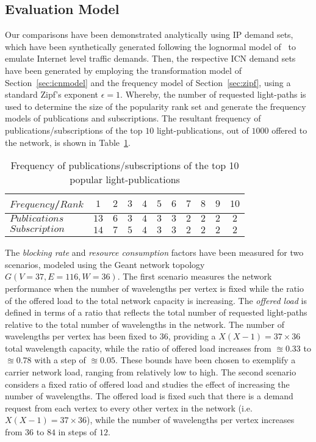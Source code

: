 \documentclass[journal]{IEEEtran}
\begin{document}
\subsection{Evaluation Model}
Our comparisons have been demonstrated analytically using IP demand sets, which have been synthetically generated following the lognormal model of~\cite{nuc:tm} to emulate Internet level traffic demands. Then, the respective ICN demand sets have been generated by employing the transformation model of Section~\ref{sec:icnmodel} and the frequency model of Section~\ref{sec:zipf}, using a standard Zipf's exponent $\epsilon=1$. Whereby, the number of requested light-paths is used to determine the size of the popularity rank set and generate the frequency models of publications and subscriptions. 
The resultant frequency of publications/subscriptions of the top $10$ light-publications, out of $1000$ offered to the network, is shown in Table~\ref{tab:frq}.
\begin{table}[tb]
  \centering
  \caption{Frequency of publications/subscriptions of the top 10 popular light-publications}
  \label{tab:frq}
  \begin{tabular}{l | c c c c c c c c c c}
  	\hline
    $Frequency$/$Rank$ & $1$ & $2$ & $3$ & $4$ & $5$ & $6$ & $7$ & $8$ & $9$ & $10$\\
     \hline 
    	$Publications$ & $13$ & $6$ & $3$ & $4$ & $3$ & $3$ & $2$ & $2$ & $2$ & $2$\\ 
    $Subscription$ & $14$ & $7$ & $5$ & $4$ & $3$ & $3$ & $2$ & $2$ & $2$ & $2$\\ 
    \hline 
  \end{tabular}
\end{table}

The \emph{blocking rate} and \emph{resource consumption} factors have been measured for two scenarios, modeled using the Geant network topology~\cite{kni:zoo} $G(V=37,E=116,W=36)$. 
The first scenario measures the network performance when the number of
wavelengths per vertex is fixed while the ratio of the offered load to
the total network capacity is increasing. The \emph{offered load} is
defined in terms of a ratio that reflects the total number of
requested light-paths relative to the total number of wavelengths in
the network. The number of wavelengths per vertex has been fixed to
$36$, providing a $X(X-1) = 37\times36$ total wavelength capacity,
while the ratio of offered load increases from $\approxeq 0.33$ to
$\approxeq 0.78$ with a step of $\approxeq 0.05$. These bounds have
been chosen to exemplify a carrier network load, ranging from
relatively low to high.
The second scenario considers a fixed ratio of offered load and
studies the effect of increasing the number of wavelengths. The
offered load is fixed such that there is a demand request from each
vertex to every other vertex in the network (i.e. $X(X-1) =
37\times36$), while the number of wavelengths per vertex increases
from $36$ to $84$ in steps of $12$.
\end{document}

